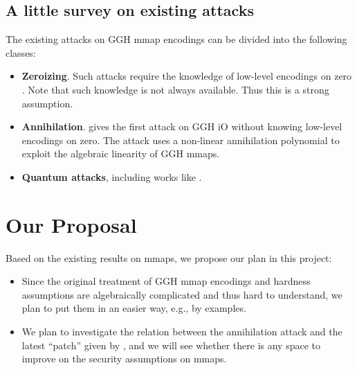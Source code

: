 \documentclass[10pt]{article}
\theoremstyle{plain}
\theoremstyle{definition}
\theoremstyle{remark}
\begin{document}
\subsection{A little survey on existing attacks}
The existing attacks on GGH mmap encodings can be divided into the following classes:
\begin{itemize}
\item {\bf Zeroizing}. Such attacks require the knowledge of low-level encodings on zero \cite{GGH13a, HJ15, CGH15}. Note that such knowledge is not always available. Thus this is a strong assumption.
\item {\bf Annihilation}. \cite{MSZ16} gives the first attack on GGH iO without knowing low-level encodings on zero. The attack uses a non-linear annihilation polynomial to exploit the algebraic linearity of GGH mmaps.
\item {\bf Quantum attacks}, including works like \cite{CDPR15, CJL16}.
\end{itemize}

\section{Our Proposal}
Based on the existing results on mmaps, we propose our plan in this project:
\begin{itemize}
\item Since the original treatment of GGH mmap encodings and hardness assumptions are algebraically complicated and thus hard to understand, we plan to put them in an easier way, e.g., by examples.
\item We plan to investigate the relation between the annihilation attack and the latest ``patch'' given by \cite{GMS16}, and we will see whether there is any space to improve on the security assumptions on mmaps.
\end{itemize}



\end{document}
